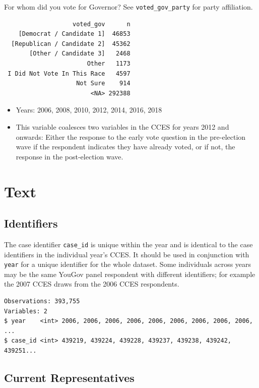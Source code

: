\documentclass[10pt,article,oneside]{memoir}
\theoremstyle{definition}
\begin{document}
For whom did you vote for Governor? See \texttt{voted\_gov\_party} for
party affiliation.

\begin{verbatim}
                   voted_gov      n
    [Democrat / Candidate 1]  46853
  [Republican / Candidate 2]  45362
       [Other / Candidate 3]   2468
                       Other   1173
 I Did Not Vote In This Race   4597
                    Not Sure    914
                        <NA> 292388
\end{verbatim}

\begin{itemize}
\tightlist
\item
  Years: 2006, 2008, 2010, 2012, 2014, 2016, 2018
\item
  This variable coalesces two variables in the CCES for years 2012 and
  onwards: Either the response to the early vote question in the
  pre-election wave if the respondent indicates they have already voted,
  or if not, the response in the post-election wave.
\end{itemize}

\newpage

\hypertarget{text}{%
\section{Text}\label{text}}

\hypertarget{identifiers}{%
\subsection{Identifiers}\label{identifiers}}

The case identifier \texttt{case\_id} is unique within the year and is
identical to the case identifiers in the individual year's CCES. It
should be used in conjunction with \texttt{year} for a unique identifier
for the whole dataset. Some individuals across years may be the same
YouGov panel respondent with different identifiers; for example the 2007
CCES draws from the 2006 CCES respondents.

\begin{verbatim}
Observations: 393,755
Variables: 2
$ year    <int> 2006, 2006, 2006, 2006, 2006, 2006, 2006, 2006, 2006, ...
$ case_id <int> 439219, 439224, 439228, 439237, 439238, 439242, 439251...
\end{verbatim}

\hypertarget{current-representatives}{%
\subsection{Current Representatives}\label{current-representatives}}
\end{document}
